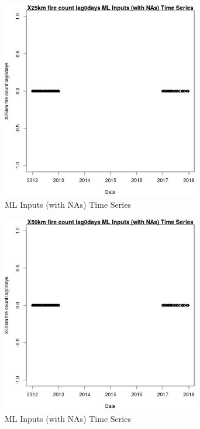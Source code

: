 \begin{figure} 
\centering  
\includegraphics[width=0.77\textwidth]{Code_Outputs/Report_ML_input_PM25_Step4_part_e_de_duplicated_aves_compiled_2019-05-14wNAs_X25km_fire_count_lag0daysvDate.jpg} 
\caption{\label{fig:Report_ML_input_PM25_Step4_part_e_de_duplicated_aves_compiled_2019-05-14wNAsX25km_fire_count_lag0daysvDate}ML Inputs (with NAs) Time Series} 
\end{figure} 
 

\clearpage 

\begin{figure} 
\centering  
\includegraphics[width=0.77\textwidth]{Code_Outputs/Report_ML_input_PM25_Step4_part_e_de_duplicated_aves_compiled_2019-05-14wNAs_X50km_fire_count_lag0daysvDate.jpg} 
\caption{\label{fig:Report_ML_input_PM25_Step4_part_e_de_duplicated_aves_compiled_2019-05-14wNAsX50km_fire_count_lag0daysvDate}ML Inputs (with NAs) Time Series} 
\end{figure} 
 

